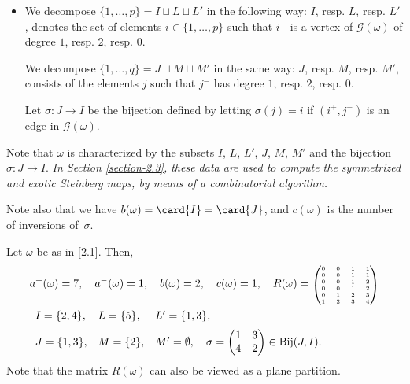 \begin{itemize}
\item We decompose $\{1,\ldots,p\}=I\sqcup L\sqcup L'$ in the following way:
$I$, resp. $L$, resp. $L'$, denotes the set of elements $i\in\{1,\ldots,p\}$ such that $i^+$ is a vertex of $\mathcal{G}(\omega)$ of degree $1$, resp. $2$, resp. $0$.

We decompose $\{1,\ldots,q\}=J\sqcup M\sqcup M'$ in the same way: $J$, resp. $M$, resp. $M'$, consists of the elements $j$ such that $j^-$ has degree $1$, resp. $2$, resp. $0$.

Let $\sigma:J\to I$ be the bijection defined by letting $\sigma(j)=i$ if $(i^+,j^-)$ is an edge in $\mathcal{G}(\omega)$.
\end{itemize}
Note that $\omega$ is characterized by the subsets $I$, $L$, $L'$, $J$, $M$, $M'$ and the bijection $\sigma:J\to I$.
{\em In Section \ref{section-2.3},
these data are used to compute
the symmetrized and exotic Steinberg maps, by means of a combinatorial algorithm.}

Note also that we have $b(\omega)=\card{I}=\card{J}$, and $c(\omega)$ is the number of inversions of~$\sigma$.



\begin{exam}
\label{E2.1}
Let $\omega$ be as in \eqref{2.1}. Then,
\begin{eqnarray*}
 & a^+(\omega)=7,\quad a^-(\omega)=1,\quad b(\omega)=2,\quad c(\omega)=1, \quad
R(\omega)=\mbox{\tiny $\begin{pmatrix} 0 & 0 & 1 & 1\\ 0 & 0 & 1 & 1\\ 0 & 0 & 1 & 2\\ 0 & 0 & 1 & 2\\ 0 & 1 & 2 & 3\\ 1 & 2 & 3 & 4 \end{pmatrix}$}\\
&
\begin{array}{llll}
I=\{2,4\}, & L=\{5\}, & L'=\{1,3\},\\[2mm]
J=\{1,3\}, & M=\{2\}, & M'=\emptyset,
\quad\sigma=\begin{pmatrix} 1 & 3\\ 4 & 2 \end{pmatrix}\in\mathrm{Bij}(J,I).
\end{array}
\end{eqnarray*}
Note that the matrix $R(\omega)$ can also be viewed as a plane partition.
\end{exam}

